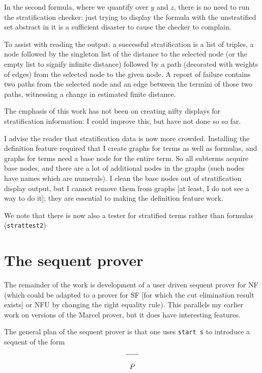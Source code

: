 \documentclass[12pt]{article}
\begin{document}
In the second formula, where we quantify over $y$ and $z$, there
is no need to run the stratification checker: just trying to
display the formula with the unstratified set abstract in it is a
sufficient disaster to cause the checker to complain.

To assist with reading the output:  a successful stratification is a list of triples, a node followed by the singleton list of the distance to the selected node (or the empty list to signify infinite distance) followed by a path (decorated with weights of edges) from the selected node to the given node.
A report of failure contains two paths from the selected node and an edge between the termini of those two paths, witnessing a change in estimated finite distance.

The emphasis of this work has not been on creating nifty displays for stratification information:  I could improve this, but have not done so so far.

I advise the reader that stratification data is now more crowded.  Installing the definition feature required that I create graphs for terms as well as formulas, and graphs for terms need a base node for the entire term.  So all subterms acquire base nodes, and there are a lot of additional nodes in the graphs (such nodes have names which are numerals).  I clean the base nodes out of stratification display output, but I cannot remove them from graphs [at least, I do not see a way to do it];  they are essential to making the definition feature work.

We note that there is now also a tester for stratified terms rather than formulas ({\tt strattest2})

\section{The sequent prover}

The remainder of the work is development of a user driven sequent prover for NF (which could be adapted to a prover for SF [for which the cut elimination result exists] or NFU by changing the right equality rule).  This parallels my earlier work on versions of the Marcel prover, but it does have interesting features.

The general plan of the sequent prover is that one uses {\tt start s}  to introduce a sequent of the form

$$\begin{array}{c}
\hline \\
P
\end{array}$$
\end{document}
